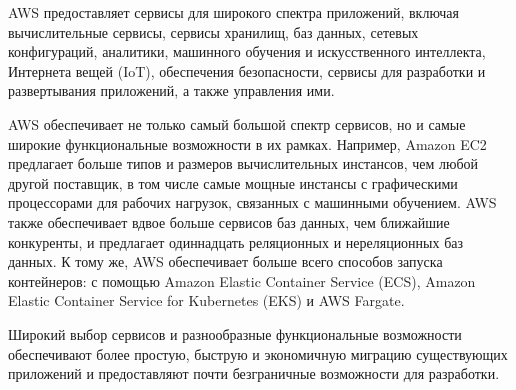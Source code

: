 AWS предоставляет сервисы для широкого спектра приложений, включая вычислительные сервисы, сервисы хранилищ, баз данных, сетевых конфигураций, аналитики, машинного обучения и искусственного интеллекта, Интернета вещей (IoT), обеспечения безопасности, сервисы для разработки и развертывания приложений, а также управления ими.

AWS обеспечивает не только самый большой спектр сервисов, но и самые широкие функциональные возможности в их рамках. Например, Amazon EC2 предлагает больше типов и размеров вычислительных инстансов, чем любой другой поставщик, в том числе самые мощные инстансы с графическими процессорами для рабочих нагрузок, связанных с машинными обучением. AWS также обеспечивает вдвое больше сервисов баз данных, чем ближайшие конкуренты, и предлагает одиннадцать реляционных и нереляционных баз данных. К тому же, AWS обеспечивает больше всего способов запуска контейнеров: с помощью Amazon Elastic Container Service (ECS), Amazon Elastic Container Service for Kubernetes (EKS) и AWS Fargate.

Широкий выбор сервисов и разнообразные функциональные возможности обеспечивают более простую, быструю и экономичную миграцию существующих приложений и предоставляют почти безграничные возможности для разработки.

